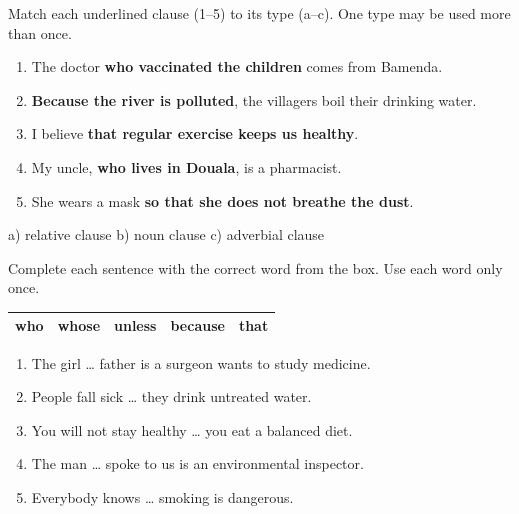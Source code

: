 \documentclass[11pt]{article}
\newcounter{popsec}
\newcounter{popsub}
\newcommand{\courssub}[1]{%
  \stepcounter{popsub}%
  \par\vspace{9pt}\noindent{\popxbold\fontsize{11.5}{13}\selectfont\color{popink}{\color{poporange}\thepopsec.\thepopsub}\hspace{6pt}#1}\par\nopagebreak\vspace{4pt}
}
\begin{document}
\begin{exercice}
Match each underlined clause (1--5) to its type (a--c). One type may be used more than once.
\begin{enumerate}
\item The doctor \textbf{who vaccinated the children} comes from Bamenda.
\item \textbf{Because the river is polluted}, the villagers boil their drinking water.
\item I believe \textbf{that regular exercise keeps us healthy}.
\item My uncle, \textbf{who lives in Douala}, is a pharmacist.
\item She wears a mask \textbf{so that she does not breathe the dust}.
\end{enumerate}
\begin{center}
a) relative clause \qquad b) noun clause \qquad c) adverbial clause
\end{center}
\end{exercice}

\begin{exercice}
Complete each sentence with the correct word from the box. Use each word only once.
\begin{center}
\begin{tabular}{|l|l|l|l|l|}
\hline
\rowcolor{popblueL} who & whose & unless & because & that \\
\hline
\end{tabular}
\end{center}
\begin{enumerate}
\item The girl \ldots{} father is a surgeon wants to study medicine.
\item People fall sick \ldots{} they drink untreated water.
\item You will not stay healthy \ldots{} you eat a balanced diet.
\item The man \ldots{} spoke to us is an environmental inspector.
\item Everybody knows \ldots{} smoking is dangerous.
\end{enumerate}
\end{exercice}

\courssub{Je m'entraîne}
\end{document}
